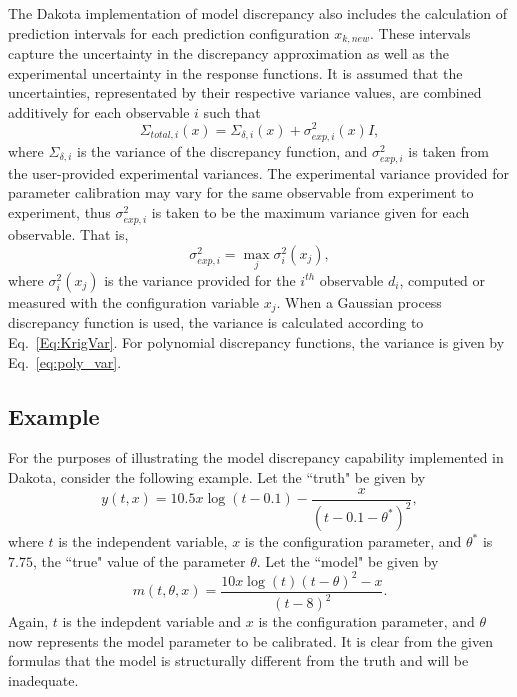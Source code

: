 The Dakota implementation of model discrepancy also includes the calculation
of prediction intervals for each prediction configuration $x_{k,new}$. These
intervals capture the uncertainty in the discrepancy approximation as well as
the experimental uncertainty in the response functions. It is assumed that the
uncertainties, representated by their respective variance values, are combined 
additively for each observable $i$ such that
\begin{equation}\label{eq:md_totalvar}
\Sigma_{total,i}(x) = \Sigma_{\delta,i}(x) + \sigma^2_{exp,i}(x)I,
\end{equation} 
where $\Sigma_{\delta,i}$ is the variance of the discrepancy function, and
$\sigma^2_{exp,i}$ is taken from the user-provided experimental variances.
The experimental variance provided for parameter calibration may vary for the
same observable from experiment to experiment, thus $\sigma^{2}_{exp,i}$ is
taken to be the maximum variance given for each observable. That is,
\begin{equation}
\sigma^2_{exp,i} = \max_{j} \sigma^2_{i}(x_j), 
\end{equation}
where $\sigma^2_{i}(x_j)$ is the variance provided for the $i^{th}$ observable
$d_i$, computed or measured with the configuration variable $x_j$. 
When a Gaussian process discrepancy function is used, the variance is calculated
according to Eq.~\ref{Eq:KrigVar}. For polynomial discrepancy functions, the
variance is given by Eq.~\ref{eq:poly_var}. 



\subsection{Example}

For the purposes of illustrating the model discrepancy capability implemented
in Dakota, consider the following example. Let the ``truth" be given by
\begin{equation}\label{eq:md_truth}
y(t,x) = 10.5 x \log(t-0.1) - \frac{x}{(t-0.1-\theta^{*})^2},
\end{equation}
where $t$ is the independent variable, $x$ is the configuration parameter, and
$\theta^{*}$ is $7.75$, the ``true" value of the parameter $\theta$. Let the
``model" be given by
\begin{equation}\label{eq:md_model}
m(t,\theta, x) = \frac{10 x \log(t) (t-\theta)^2 - x}{(t-8)^2}. 
\end{equation}
Again, $t$ is the indepdent variable and $x$ is the configuration parameter,
and $\theta$ now represents the model parameter to be calibrated. It is clear
from the given formulas that the model is structurally different from the truth
and will be inadequate. 

